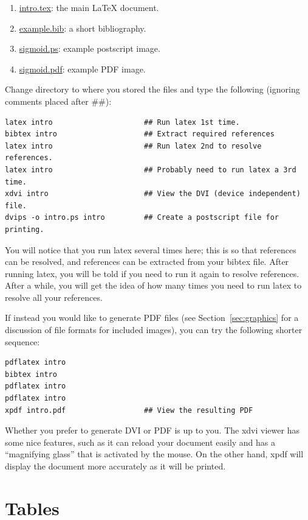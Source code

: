 \documentclass{article}
\providecommand*{\latex}{\LaTeX\xspace}
\begin{document}
\begin{enumerate}
  \item \url{intro.tex}: the main \latex document.
  \item \url{example.bib}: a short bibliography.
  \item \url{sigmoid.ps}: example postscript image.
  \item \url{sigmoid.pdf}: example PDF image.
\end{enumerate}

Change directory to where you stored the files and type the
following (ignoring comments placed after \#\#):

\begin{verbatim}
latex intro                     ## Run latex 1st time.
bibtex intro                    ## Extract required references
latex intro                     ## Run latex 2nd to resolve references.
latex intro                     ## Probably need to run latex a 3rd time.
xdvi intro                      ## View the DVI (device independent) file.
dvips -o intro.ps intro         ## Create a postscript file for printing.
\end{verbatim}

You will notice that you run latex several times here; this is so that
references can be resolved, and references can be extracted from your
bibtex file.  After running latex, you will be told if you need to run
it again to resolve references.  After a while, you will get the idea
of how many times you need to run latex to resolve all your
references.

If instead you would like to generate PDF files (see
Section~\ref{sec:graphics} for a discussion of file formats for
included images), you can try the following shorter sequence:

\begin{verbatim}
pdflatex intro
bibtex intro
pdflatex intro
pdflatex intro
xpdf intro.pdf                  ## View the resulting PDF
\end{verbatim}

Whether you prefer to generate DVI or PDF is up to you.  The xdvi
viewer has some nice features, such as it can reload your document
easily and has a ``magnifying glass'' that is activated by the mouse.
On the other hand, xpdf will display the document more accurately as
it will be printed.

\section{Tables}
\end{document}
